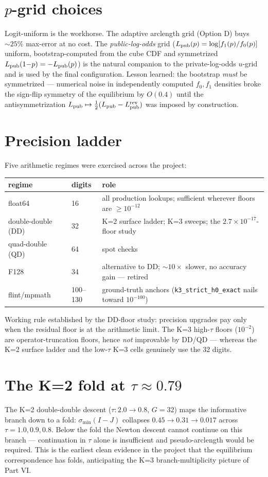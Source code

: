 \section{$p$-grid choices}
Logit-uniform is the workhorse. The adaptive arclength grid (Option D)
buys $\sim 25\%$ max-error at no cost. The \emph{public-log-odds} grid
($L_{\rm pub}(p) = \log[f_1(p)/f_0(p)]$ uniform, bootstrap-computed from the
cube CDF and symmetrized $L_{\rm pub}(1{-}p) = -L_{\rm pub}(p)$) is the natural
companion to the private-log-odds $u$-grid and is used by the final
configuration. Lesson learned: the bootstrap \emph{must} be symmetrized
--- numerical noise in independently computed $f_0, f_1$ densities broke
the sign-flip symmetry of the equilibrium by $O(0.4)$ until the
antisymmetrization $L_{\rm pub} \mapsto \tfrac12(L_{\rm pub} - L_{\rm pub}^{\rm rev})$ was
imposed by construction.

\section{Precision ladder}
Five arithmetic regimes were exercised across the project:
\begin{center}\begin{tabular}{lll}\toprule
regime & digits & role \\
\midrule
float64 & 16 & all production lookups; sufficient wherever floors are $\ge 10^{-12}$ \\
double-double (DD) & 32 & K=2 surface ladder; K=3 sweeps; the $2.7\times10^{-17}$-floor study \\
quad-double (QD) & 64 & spot checks \\
F128 & 34 & alternative to DD; $\sim 10\times$ slower, no accuracy gain --- retired \\
flint/mpmath & 100--130 & ground-truth anchors (\texttt{k3\_strict\_h0\_exact} nails toward $10^{-100}$) \\
\bottomrule\end{tabular}\end{center}
Working rule established by the DD-floor study: precision upgrades pay
only when the residual floor is at the arithmetic limit. The K=3
high-$\tau$ floors ($10^{-2}$) are operator-truncation floors, hence
\emph{not} improvable by DD/QD --- whereas the K=2 surface ladder and
the low-$\tau$ K=3 cells genuinely use the 32 digits.

\section{The K=2 fold at $\tau \approx 0.79$}
The K=2 double-double descent ($\tau: 2.0 \to 0.8$, $G = 32$) maps the
informative branch down to a fold: $\sigma_{\min}(I - J)$ collapses
$0.45 \to 0.31 \to 0.017$ across $\tau = 1.0, 0.9, 0.8$. Below the fold
the Newton descent cannot continue on this branch --- continuation in
$\tau$ alone is insufficient and pseudo-arclength would be required.
This is the earliest clean evidence in the project that the equilibrium
correspondence has folds, anticipating the K=3 branch-multiplicity
picture of Part VI.

